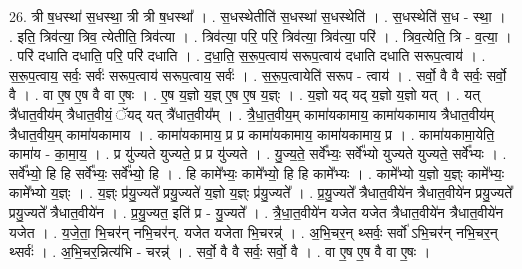 \documentclass[17pt]{extarticle}
\begin{document}
26. त्री ष॒धस्था॑ स॒धस्था॒ त्री त्री ष॒धस्था᳚ । . स॒धस्थेतीति॑ स॒धस्था॑ स॒धस्थेति॑ । . स॒धस्थेति॑ स॒ध - स्था॒ । . इति॒ त्रिव॑त्या॒ त्रिव॒ त्येतीति॒ त्रिव॑त्या । . त्रिव॑त्या॒ परि॒ परि॒ त्रिव॑त्या॒ त्रिव॑त्या॒ परि॑ । . त्रिव॒त्येति॒ त्रि - व॒त्या॒ । . परि॑ दधाति दधाति॒ परि॒ परि॑ दधाति । . द॒धा॒ति॒ स॒रू॒प॒त्वाय॑ सरूप॒त्वाय॑ दधाति दधाति सरूप॒त्वाय॑ । . स॒रू॒प॒त्वाय॒ सर्वः॒ सर्वः॑ सरूप॒त्वाय॑ सरूप॒त्वाय॒ सर्वः॑ । . स॒रू॒प॒त्वायेति॑ सरूप - त्वाय॑ । . सर्वो॒ वै वै सर्वः॒ सर्वो॒ वै । . वा ए॒ष ए॒ष वै वा ए॒षः । . ए॒ष य॒ज्ञो य॒ज्ञ् ए॒ष ए॒ष य॒ज्ञ्ः । . य॒ज्ञो यद् यद् य॒ज्ञो य॒ज्ञो यत् । . यत् त्रै॑धात॒वीय॑म् त्रैधात॒वीयं॒ ॅयद् यत् त्रै॑धात॒वीय᳚म् । . त्रै॒धा॒त॒वीय॒म् कामा॑यकामाय॒ कामा॑यकामाय त्रैधात॒वीय॑म् त्रैधात॒वीय॒म् कामा॑यकामाय । . कामा॑यकामाय॒ प्र प्र कामा॑यकामाय॒ कामा॑यकामाय॒ प्र । . कामा॑यकामा॒येति॒ कामा॑य - का॒मा॒य॒ । . प्र यु॑ज्यते युज्यते॒ प्र प्र यु॑ज्यते । . यु॒ज्य॒ते॒ सर्वे᳚भ्यः॒ सर्वे᳚भ्यो युज्यते युज्यते॒ सर्वे᳚भ्यः । . सर्वे᳚भ्यो॒ हि हि सर्वे᳚भ्यः॒ सर्वे᳚भ्यो॒ हि । . हि कामे᳚भ्यः॒ कामे᳚भ्यो॒ हि हि कामे᳚भ्यः । . कामे᳚भ्यो य॒ज्ञो य॒ज्ञ्ः कामे᳚भ्यः॒ कामे᳚भ्यो य॒ज्ञ्ः । . य॒ज्ञ्ः प्र॑यु॒ज्यते᳚ प्रयु॒ज्यते॑ य॒ज्ञो य॒ज्ञ्ः प्र॑यु॒ज्यते᳚ । . प्र॒यु॒ज्यते᳚ त्रैधात॒वीये॑न त्रैधात॒वीये॑न प्रयु॒ज्यते᳚ प्रयु॒ज्यते᳚ त्रैधात॒वीये॑न । . प्र॒यु॒ज्यत॒ इति॑ प्र - यु॒ज्यते᳚ । . त्रै॒धा॒त॒वीये॑न यजेत यजेत त्रैधात॒वीये॑न त्रैधात॒वीये॑न यजेत । . य॒जे॒ता॒ भि॒चर॑न् नभि॒चर॑न्. यजेत यजेता भि॒चरन्न्॑ । . अ॒भि॒चर॒न् थ्सर्वः॒ सर्वो॑ ऽभि॒चर॑न् नभि॒चर॒न् थ्सर्वः॑ । . अ॒भि॒चर॒न्नित्य॑भि - चरन्न्॑ । . सर्वो॒ वै वै सर्वः॒ सर्वो॒ वै । . वा ए॒ष ए॒ष वै वा ए॒षः । \newline
\end{document}
